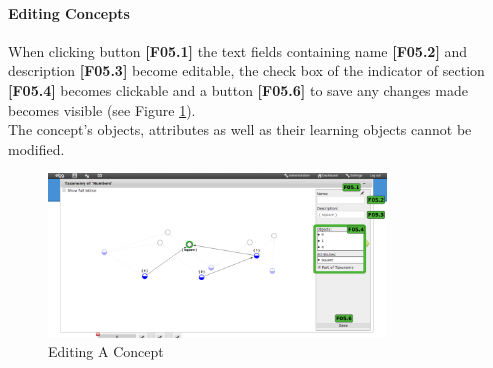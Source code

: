 \documentclass[a4paper,11pt]{article}
\begin{document}
\paragraph*{Editing Concepts\\}
When clicking button \textbf{[F05.1]} the text fields containing name \textbf{[F05.2]} and description \textbf{[F05.3]} become editable, the check box of the indicator of section \textbf{[F05.4]} becomes clickable and a button \textbf{[F05.6]}  to save any changes made becomes visible (see Figure \ref{fig:fca-taxonomy-edit}).\\
The concept's objects, attributes as well as their learning objects cannot be modified.
\begin{figure}[h]
\begin{center}
\includegraphics[width=0.8\textwidth]{figures/taxonomy_edit}  
\end{center}
\caption{Editing A Concept}
\label{fig:fca-taxonomy-edit}
\end{figure}
\end{document}
